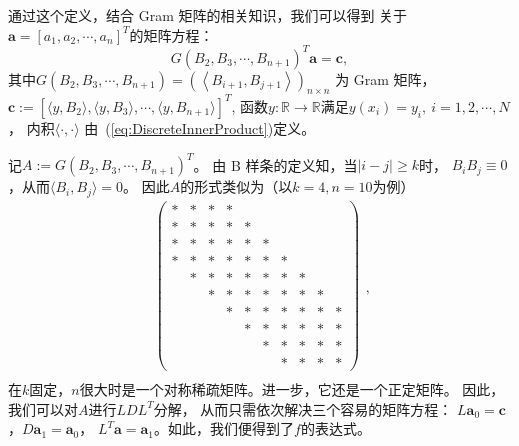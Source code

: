 通过这个定义，结合 Gram 矩阵的相关知识，我们可以得到
关于$\mathbf{a}=[a_{1},a_{2},\cdots,a_{n}]^{T}$的矩阵方程：
\begin{equation}
  \label{eq:DLSSplinesApproximationviaNormalEquations}
  G(B_{2},B_{3},\cdots,B_{n+1})^{T}\mathbf{a}=\mathbf{c},
\end{equation}
其中$G(B_{2},B_{3},\cdots,B_{n+1})=
\left(\left\langle B_{i+1}, B_{j+1}\right\rangle\right)_{n\times n}$
为 Gram 矩阵，
$\mathbf{c}:=[\langle y,B_{2}\rangle,
\langle y,B_{3}\rangle,\cdots,\langle y,B_{n+1}\rangle]^{T}$,
函数$y:\mathbb{R}\to \mathbb{R}$满足$y(x_{i})=y_{i},\ i=1,2,\cdots,N$，
内积$\langle\cdot,\cdot\rangle$
由~(\ref{eq:DiscreteInnerProduct})定义。

记$A:=G(B_{2},B_{3},\cdots,B_{n+1})^{T}$。
由 B 样条的定义知，当$|i-j|\ge k$时，
$B_{i}B_{j}\equiv 0$，从而$\langle B_{i},B_{j}\rangle=0$。
因此$A$的形式类似为（以$k=4,n=10$为例）
\begin{displaymath}
  \begin{aligned}
    \begin{pmatrix}
        \ast& \ast& \ast& \ast&     &     &     &     &     &     \\
        \ast& \ast& \ast& \ast& \ast&     &     &     &     &     \\
        \ast& \ast& \ast& \ast& \ast& \ast&     &     &     &     \\
        \ast& \ast& \ast& \ast& \ast& \ast& \ast&     &     &     \\
            & \ast& \ast& \ast& \ast& \ast& \ast& \ast&     &     \\
            &     & \ast& \ast& \ast& \ast& \ast& \ast& \ast&     \\
            &     &     & \ast& \ast& \ast& \ast& \ast& \ast& \ast\\
            &     &     &     & \ast& \ast& \ast& \ast& \ast& \ast\\
            &     &     &     &     & \ast& \ast& \ast& \ast& \ast\\
            &     &     &     &     &     & \ast& \ast& \ast& \ast
    \end{pmatrix}\\
  \end{aligned}
  ,
\end{displaymath}
在$k$固定，$n$很大时是一个对称稀疏矩阵。进一步，它还是一个正定矩阵。
因此，我们可以对$A$进行$LDL^{T}$分解，
从而只需依次解决三个容易的矩阵方程：
$L\mathbf{a}_{0}=\mathbf{c}$，$D\mathbf{a}_{1}=\mathbf{a}_{0}$，
$L^{T}\mathbf{a}=\mathbf{a}_{1}$。如此，我们便得到了$f$的表达式。

